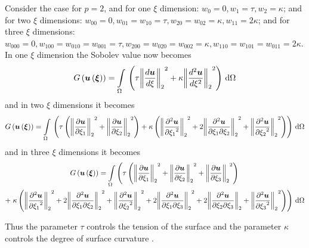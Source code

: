 Consider the case for $p=2$, and for one $\xi$ dimension: $w_{0}=0,
w_{1}=\tau, w_{2}=\kappa$; and for two $\xi$ dimensions: $w_{00}=0,
w_{01}=w_{10}=\tau, w_{20}=w_{02}= \kappa, w_{11}=2\kappa$; and for three
$\xi$ dimensions: $w_{000}=0, w_{100}=w_{010}=w_{001}=\tau,
w_{200}=w_{020}=w_{002}= \kappa, w_{110}=w_{101}=w_{011}=2\kappa$. In one
$\xi$ dimension the Sobolev value now becomes
\begin{equation}
  \fnof{G}{\fnof{\vectr{u}}{\vectr{\xi}}}=\goneint{\pbrac{\tau
      \norm{\dby{\vectr{u}}{\xi}}^{2}+\kappa\norm{\dtwosqby{
          \vectr{u}}{\xi}}^{2}}}{\Omega}
  \label{eqn:1DptwoSobolevnorm}
\end{equation}
and in two $\xi$ dimensions it becomes
\begin{equation}
  \fnof{G}{\fnof{\vectr{u}}{\vectr{\xi}}}=\goneint{\pbrac{\tau\pbrac{
        \norm{\delby{\vectr{u}}{\xione}}^{2}+\norm{\delby{\vect{u}}
          {\xitwo}}^{2}}+\kappa\pbrac{\norm{\deltwosqby{\vectr{u}}{\xione}}^{2}+
        2\norm{\deltwoby{\vectr{u}}{\xione}{\xitwo}}^{2}+
        \norm{\deltwosqby{\vectr{u}}{\xitwo}}^{2}}}}{\Omega}
  \label{eqn:2DptwoSobolevnorm}
\end{equation}
and in three $\xi$ dimensions it becomes
\begin{multline}
  \fnof{G}{\fnof{\vectr{u}}{\vectr{\xi}}}=\dintl{\Omega}{}\left(\tau\pbrac{
        \norm{\delby{\vectr{u}}{\xione}}^{2}+\norm{\delby{\vect{u}}
          {\xitwo}}^{2}+\norm{\delby{\vect{u}}
          {\xithree}}^{2}}\right. \\
    +\left.\kappa\pbrac{\norm{\deltwosqby{\vectr{u}}{\xione}}^{2}+
        2\norm{\deltwoby{\vectr{u}}{\xione}{\xitwo}}^{2}+
        \norm{\deltwosqby{\vectr{u}}{\xitwo}}^{2}+
        2\norm{\deltwoby{\vectr{u}}{\xione}{\xithree}}^{2}+
        2\norm{\deltwoby{\vectr{u}}{\xitwo}{\xithree}}+
        \norm{\deltwosqby{\vectr{u}}{\xithree}}^{2}}\right)\,\exteriorderivop\Omega
  \label{eqn:3DptwoSobolevnorm}
\end{multline}

Thus the parameter $\tau$ controls the tension of the surface and the
parameter $\kappa$ controls the degree of surface curvature
\cite{terzopoulos:1986}.

